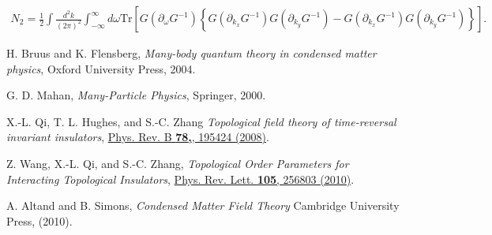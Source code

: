 \documentclass[english]{scrartcl}
\newcommand{\mr}{\mathrm}
\begin{document}
\begin{align}
N_2 = \frac{1}{2} \int \frac{d^2 k}{(2\pi)^2} \int_{-\infty}^\infty d \omega \mr{Tr}\left [G (\partial_\omega G^{-1}) \left \{G (\partial_{k_x} G^{-1}) G (\partial_{k_y} G^{-1}) - G (\partial_{k_x} G^{-1}) G (\partial_{k_y} G^{-1}) \right \} \right ]. \label{Eqn:winding_number_GF}
\end{align}

\printnoidxglossaries

\newpage
\begin{thebibliography}{10}
 H. Bruus and K. Flensberg, {\em Many-body quantum theory in condensed matter physics}, {Oxford University Press, 2004}.

 G. D. Mahan, {\em  Many-Particle Physics}, {Springer, 2000}.

X.-L. Qi, T. L. Hughes, and S.-C. Zhang {\em Topological field theory of time-reversal invariant insulators}, \href{Xiao-Liang Qi, Taylor L. Hughes, and Shou-Cheng Zhang}{Phys. Rev. B {\bfseries 78,}, 195424 (2008)}.

Z. Wang, X.-L. Qi, and S.-C. Zhang, {\em Topological Order Parameters for Interacting Topological Insulators}, \href{https://journals.aps.org/prl/abstract/10.1103/PhysRevLett.105.256803}{Phys. Rev. Lett. {\bfseries 105}, 256803 (2010)}.

A. Altand and B. Simons, {\em Condensed Matter Field Theory} Cambridge University Press, (2010).

\end{thebibliography}
\end{document}
